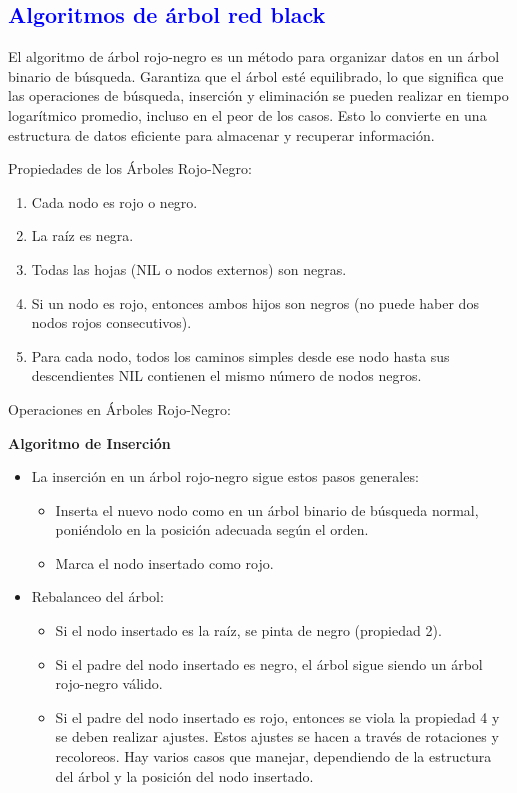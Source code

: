 \documentclass[12pt]{article}
\begin{document}
\subsection*{\textcolor{blue}{Algoritmos de árbol red black }}
El algoritmo de árbol rojo-negro es un método para organizar datos en un árbol binario de búsqueda. Garantiza que el árbol esté equilibrado, lo que significa que las operaciones de búsqueda, inserción y eliminación se pueden realizar en tiempo logarítmico promedio, incluso en el peor de los casos. Esto lo convierte en una estructura de datos eficiente para almacenar y recuperar información.
\par\vspace{0.4cm}
Propiedades de los Árboles Rojo-Negro:
\begin{enumerate}
    \item Cada nodo es rojo o negro.
    \item La raíz es negra.
    \item Todas las hojas (NIL o nodos externos) son negras.
    \item Si un nodo es rojo, entonces ambos hijos son negros (no puede haber dos nodos rojos consecutivos).
    \item Para cada nodo, todos los caminos simples desde ese nodo hasta sus descendientes NIL contienen el mismo número de nodos negros.
\end{enumerate}
Operaciones en Árboles Rojo-Negro:
\par\vspace{0.4cm}
\textbf{Algoritmo de Inserción}
\begin{itemize}
    \item La inserción en un árbol rojo-negro sigue estos pasos generales:
    \begin{itemize}
        \item Inserta el nuevo nodo como en un árbol binario de búsqueda normal, poniéndolo en la posición adecuada según el orden.
        \item Marca el nodo insertado como rojo.
    \end{itemize}
    \item Rebalanceo del árbol:
    \begin{itemize}
        \item Si el nodo insertado es la raíz, se pinta de negro (propiedad 2).
        \item Si el padre del nodo insertado es negro, el árbol sigue siendo un árbol rojo-negro válido.
        \item Si el padre del nodo insertado es rojo, entonces se viola la propiedad 4 y se deben realizar ajustes. Estos ajustes se hacen a través de rotaciones y recoloreos. Hay varios casos que manejar, dependiendo de la estructura del árbol y la posición del nodo insertado.
    \end{itemize}
\end{itemize}
\end{document}
